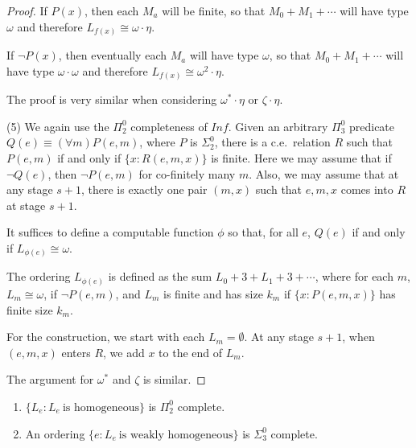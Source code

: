 \documentclass[11pt]{amsart}
\theoremstyle{definition}
\begin{document}
\begin{proof}
If $P(x)$, then each $M_a$ will be finite, so that $M_0 + M_1 + \cdots$ will have type $\omega$ and therefore $L_{f(x)} \cong \omega \cdot \eta$. 

If $\neg P(x)$, then eventually each $M_a$ will have type $\omega$,  so that $M_0 + M_1 + \cdots$ will have type $\omega \cdot \omega$ and therefore $L_{f(x)} \cong \omega^2 \cdot \eta$. 

The proof is very similar when considering $\omega^*\cdot\eta$ or $\zeta\cdot\eta$.

\medskip

(5) We again use the $\Pi^0_2$ completeness of $Inf$. Given an arbitrary $\Pi^0_3$ predicate $Q(e) \equiv (\forall m) P(e,m)$, where $P$ is $\Sigma^0_2$, there is a c.e.\ relation $R$ such that $P(e,m)$ if and only if $\{x: R(e,m,x)\}$ is finite. Here we may assume that if $\neg Q(e)$, then $\neg P(e,m)$ for co-finitely many $m$. Also, we may assume that at any stage $s+1$, there is exactly one pair $(m,x)$ such that $e,m,x$ comes into $R$ at stage $s+1$. 

It suffices to define a computable function $\phi$ so that, for all $e$, $Q(e)$ if and only if $L_{\phi(e)} \cong \omega$. 

The ordering $L_{\phi(e)}$ is defined as the sum $L_0 + 3 + L_1 + 3 +  \dotsb$, where for each $m$, $L_m \cong \omega$, if $\neg P(e,m)$, and $L_m$ is finite and has size $k_m$ if $\{x: P(e,m,x)\}$ has finite size $k_m$. 

For the construction, we start with each $L_m = \emptyset$.  At any stage $s+1$,
when $(e,m,x)$ enters $R$, we add $x$ to the end of $L_m$. 

The argument for $\omega^*$ and $\zeta$ is similar. 

\end{proof}

\begin{theorem} \begin{enumerate}
\item $\{L_e: L_e\ \text{is homogeneous}\}$ is $\Pi^0_2$ complete.
\item An ordering $\{e: L_e\ \text{is weakly homogeneous}\}$ is $\Sigma^0_3$ complete.
\end{enumerate}
\end{theorem} 
\end{document}
